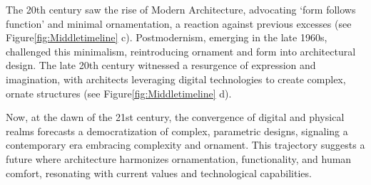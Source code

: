 The 20th century saw the rise of Modern Architecture, advocating `form follows function' and minimal ornamentation, a reaction against previous excesses\cite{Gage2015, Venturi1972} (see Figure\ref{fig:Middletimeline} c).
Postmodernism, emerging in the late 1960s, challenged this minimalism, reintroducing ornament and form into architectural design.
The late 20th century witnessed a resurgence of expression and imagination, with architects leveraging digital technologies to create complex, ornate structures\cite{Burlando2019} (see Figure\ref{fig:Middletimeline} d).

Now, at the dawn of the 21st century, the convergence of digital and physical realms forecasts a democratization of complex, parametric designs, signaling a contemporary era embracing complexity and ornament\cite{Schwab2016}.
This trajectory suggests a future where architecture harmonizes ornamentation, functionality, and human comfort, resonating with current values and technological capabilities.


